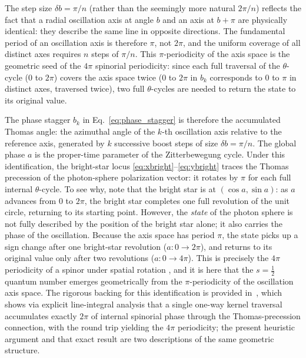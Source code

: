 \documentclass[%
 reprint, amsmath,amssymb, aps, prb, ]{revtex4-2}
\numberwithin{equation}{section}
\newcommand{\iphase}{\theta}
\begin{document}
The step size $\delta b = \pi/n$ (rather than the seemingly more natural $2\pi/n$) reflects the fact that a radial oscillation axis at angle $b$ and an axis at $b + \pi$ are physically identical: they describe the same line in opposite directions.
The fundamental period of an oscillation axis is therefore $\pi$, not $2\pi$, and the uniform coverage of all distinct axes requires $n$ steps of $\pi/n$.
This $\pi$-periodicity of the axis space is the geometric seed of the $4\pi$ spinorial periodicity: since each full traversal of the $\iphase$-cycle ($0$ to $2\pi$) covers the axis space twice ($0$ to $2\pi$ in $b_k$ corresponds to $0$ to $\pi$ in distinct axes, traversed twice), two full $\iphase$-cycles are needed to return the state to its original value.

The phase stagger $b_k$ in Eq.~\eqref{eq:phase_stagger} is therefore the accumulated Thomas angle: the azimuthal angle of the $k$-th oscillation axis relative to the reference axis, generated by $k$ successive boost steps of size $\delta b = \pi/n$.
The global phase $a$ is the proper-time parameter of the Zitterbewegung cycle.
Under this identification, the bright-star locus \eqref{eq:xbright}--\eqref{eq:ybright} traces the Thomas precession of the photon-sphere polarization vector: it rotates by $\pi$ for each full internal $\iphase$-cycle.
To see why, note that the bright star is at $(\cos a,\sin a)$: as $a$ advances from $0$ to $2\pi$, the bright star completes one full revolution of the unit circle, returning to its starting point.
However, the \emph{state} of the photon sphere is not fully described by the position of the bright star alone; it also carries the phase of the oscillation.
Because the axis space has period $\pi$, the state picks up a sign change after one bright-star revolution ($a: 0\to 2\pi$), and returns to its original value only after two revolutions ($a: 0 \to 4\pi$).
This is precisely the $4\pi$ periodicity of a spinor under spatial rotation \cite{hanamura19}, and it is here that the $s=\tfrac{1}{2}$ quantum number emerges geometrically from the $\pi$-periodicity of the oscillation axis space. The rigorous backing for this identification is provided in~\cite{hanamura29}, which shows via explicit line-integral analysis that a single one-way kernel traversal accumulates exactly $2\pi$ of internal spinorial phase through the Thomas-precession connection, with the round trip yielding the $4\pi$ periodicity; the present heuristic argument and that exact result are two descriptions of the same geometric structure.
\end{document}
